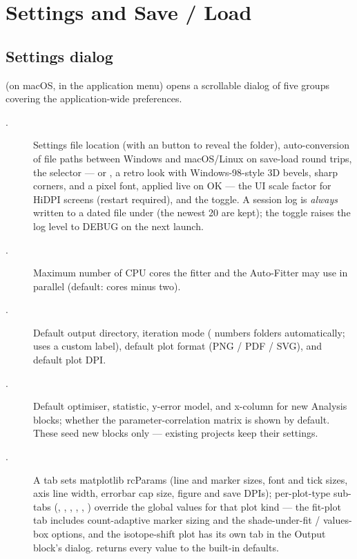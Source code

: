 \section{Settings and Save / Load}
\label{sec:settings}

\subsection{Settings dialog}

 (on macOS, in the application
menu) opens a scrollable dialog of five groups covering the
application-wide preferences.

\begin{description}
    \item[.]
        Settings file location (with an  button to reveal
        the folder), auto-conversion of file paths between Windows and
        macOS/Linux on save-load round trips, the  selector
        ---  or , a retro
        look with Windows-98-style 3D bevels, sharp corners, and a
        pixel font, applied live on OK --- the UI scale factor for
        HiDPI screens (restart required), and the
         toggle. A session log is
        \emph{always} written to a dated file under 
        (the newest 20 are kept); the toggle raises the log level to
        DEBUG on the next launch.
    \item[.]
        Maximum number of CPU cores the fitter and the Auto-Fitter
        may use in parallel (default: cores minus two).
    \item[.]
        Default output directory, iteration mode (
        numbers  folders automatically; 
        uses a custom label), default plot format (PNG / PDF / SVG),
        and default plot DPI.
    \item[.]
        Default optimiser, statistic, y-error model, and x-column for
        new Analysis blocks; whether the parameter-correlation
        matrix is shown by default. These seed new blocks only ---
        existing projects keep their settings.
    \item[.]
        A  tab sets matplotlib rcParams (line and marker
        sizes, font and tick sizes, axis line width, errorbar cap
        size, figure and save DPIs); per-plot-type sub-tabs
        (, , ,
        , , )
        override the global values for that plot kind --- the
        fit-plot tab includes count-adaptive marker sizing and the
        shade-under-fit / values-box options, and the isotope-shift
        plot has its own tab in the Output block's
         dialog.  returns every value to the built-in defaults.
\end{description}

